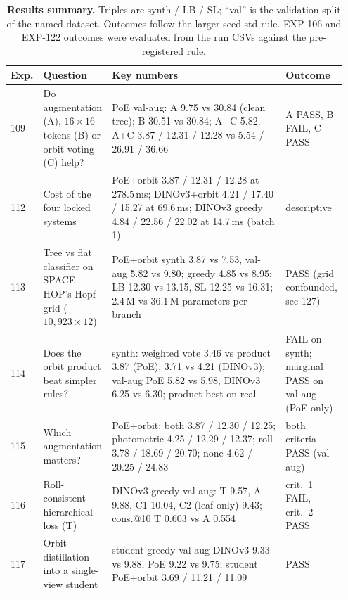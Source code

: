 \begin{table}[t]
  \centering\footnotesize
  \setlength{\tabcolsep}{3pt}
  \caption{\textbf{Results summary.} Triples are synth / LB / SL; ``val'' is the validation split of the named dataset. Outcomes follow the larger-seed-std rule. EXP-106 and EXP-122 outcomes were evaluated from the run CSVs against the pre-registered rule.}
  \label{app:z_tab_results}
  \begin{tabular}{@{}p{0.05\linewidth}p{0.2\linewidth}p{0.52\linewidth}p{0.18\linewidth}@{}}
    \toprule
    \raggedright Exp. & \raggedright Question & \raggedright Key numbers & \raggedright Outcome\tabularnewline
    \midrule
    \raggedright 109 & \raggedright Do augmentation (A), $16\times16$ tokens (B) or orbit voting (C) help? & \raggedright PoE val-aug: A 9.75 vs 30.84 (clean tree); B 30.51 vs 30.84; A+C 5.82. A+C 3.87 / 12.31 / 12.28 vs 5.54 / 26.91 / 36.66 & \raggedright A PASS, B FAIL, C PASS\tabularnewline
    \raggedright 112 & \raggedright Cost of the four locked systems & \raggedright PoE+orbit 3.87 / 12.31 / 12.28 at 278.5\,ms; DINOv3+orbit 4.21 / 17.40 / 15.27 at 69.6\,ms; DINOv3 greedy 4.84 / 22.56 / 22.02 at 14.7\,ms (batch 1) & \raggedright descriptive\tabularnewline
    \raggedright 113 & \raggedright Tree vs flat classifier on SPACE-HOP's Hopf grid ($10{,}923\times12$) & \raggedright PoE+orbit synth 3.87 vs 7.53, val-aug 5.82 vs 9.80; greedy 4.85 vs 8.95; LB 12.30 vs 13.15, SL 12.25 vs 16.31; 2.4\,M vs 36.1\,M parameters per branch & \raggedright PASS (grid confounded, see 127)\tabularnewline
    \raggedright 114 & \raggedright Does the orbit product beat simpler rules? & \raggedright synth: weighted vote 3.46 vs product 3.87 (PoE), 3.71 vs 4.21 (DINOv3); val-aug PoE 5.82 vs 5.98, DINOv3 6.25 vs 6.30; product best on real & \raggedright FAIL on synth; marginal PASS on val-aug (PoE only)\tabularnewline
    \raggedright 115 & \raggedright Which augmentation matters? & \raggedright PoE+orbit: both 3.87 / 12.30 / 12.25; photometric 4.25 / 12.29 / 12.37; roll 3.78 / 18.69 / 20.70; none 4.62 / 20.25 / 24.83 & \raggedright both criteria PASS (val-aug)\tabularnewline
    \raggedright 116 & \raggedright Roll-consistent hierarchical loss (T) & \raggedright DINOv3 greedy val-aug: T 9.57, A 9.88, C1 10.04, C2 (leaf-only) 9.43; cons.@10 T 0.603 vs A 0.554 & \raggedright crit.\ 1 FAIL, crit.\ 2 PASS\tabularnewline
    \raggedright 117 & \raggedright Orbit distillation into a single-view student & \raggedright student greedy val-aug DINOv3 9.33 vs 9.88, PoE 9.22 vs 9.75; student PoE+orbit 3.69 / 11.21 / 11.09 & \raggedright PASS\tabularnewline

\end{tabular}
\end{table}
